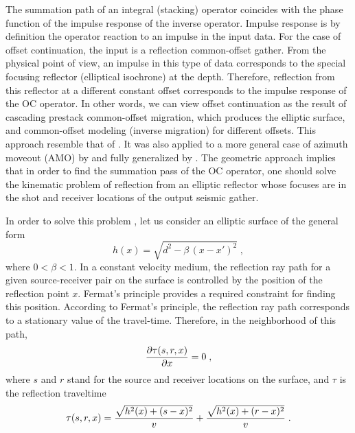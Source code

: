 The summation path of an integral (stacking) operator coincides with
the phase function of the impulse response of the inverse operator.
Impulse response is by definition the operator reaction to an impulse
in the input data. For the case of offset continuation, the input is a
reflection common-offset gather. From the physical point of view, an
impulse in this type of data corresponds to the special focusing
reflector (elliptical isochrone) at the depth. Therefore, reflection
from this reflector at a different constant offset corresponds to the
impulse response of the OC operator.  In other words, we can view
offset continuation as the result of cascading prestack common-offset
migration, which produces the elliptic surface, and common-offset
modeling (inverse migration) for different offsets.  This approach
resemble that of \cite{GPR29-03-03740406}.  It was also applied to a
more general case of azimuth moveout (AMO) by
\cite{SEG-1995-1449} and fully generalized by 
\cite{GPR48-01-01350162}.  The geometric approach implies that
in order to find the summation pass of the OC operator, one should
solve the kinematic problem of reflection from an elliptic reflector
whose focuses are in the shot and receiver locations of the output
seismic gather.

In order to solve this problem , let us consider an elliptic surface of
the general form
\begin{equation}
h(x)=\sqrt{d^2-\beta\,(x-x')^2}\;,
\label{eqn:ellips}
\end{equation}
where $0 < \beta < 1$. In a constant velocity medium, the reflection
ray path for a given source-receiver pair on the surface is controlled
by the position of the reflection point $x$.  Fermat's principle
provides a required constraint for finding this position. According to
Fermat's principle, the reflection ray path corresponds to a
stationary value of the travel-time. Therefore, in the neighborhood of
this path,
\begin{equation}
{\partial \tau(s,r,x) \over \partial x} = 0\;,
\label{eqn:fermat1}
\end{equation}
where $s$ and $r$ stand for the source and receiver locations on the
surface, and $\tau$ is the reflection traveltime
\begin{equation}
\tau(s,r,x) =   { \sqrt{h^2(x)+(s-x)^2} \over v} + 
                { \sqrt{h^2(x)+(r-x)^2} \over v}\;.
\label{eqn:length1}
\end{equation}


